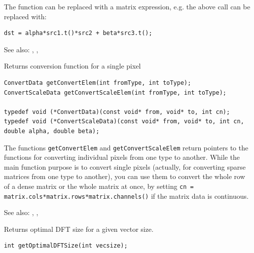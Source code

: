 The function can be replaced with a matrix expression, e.g. the above call can be replaced with:
\begin{lstlisting}
dst = alpha*src1.t()*src2 + beta*src3.t();
\end{lstlisting}

See also: , , 


\label{getConvertElem}
Returns conversion function for a single pixel

\begin{lstlisting}
ConvertData getConvertElem(int fromType, int toType);
ConvertScaleData getConvertScaleElem(int fromType, int toType);

typedef void (*ConvertData)(const void* from, void* to, int cn);
typedef void (*ConvertScaleData)(const void* from, void* to, int cn, double alpha, double beta);
\end{lstlisting}
\begin{description}
\end{description}

The functions \texttt{getConvertElem} and \texttt{getConvertScaleElem} return pointers to the functions for converting individual pixels from one type to another. While the main function purpose is to convert single pixels (actually, for converting sparse matrices from one type to another), you can use them to convert the whole row of a dense matrix or the whole matrix at once, by setting \texttt{cn = matrix.cols*matrix.rows*matrix.channels()} if the matrix data is continuous.

See also: , , 


\label{getOptimalDFTSize}
Returns optimal DFT size for a given vector size.

\begin{lstlisting}
int getOptimalDFTSize(int vecsize);
\end{lstlisting}
\begin{description}
\end{description}

